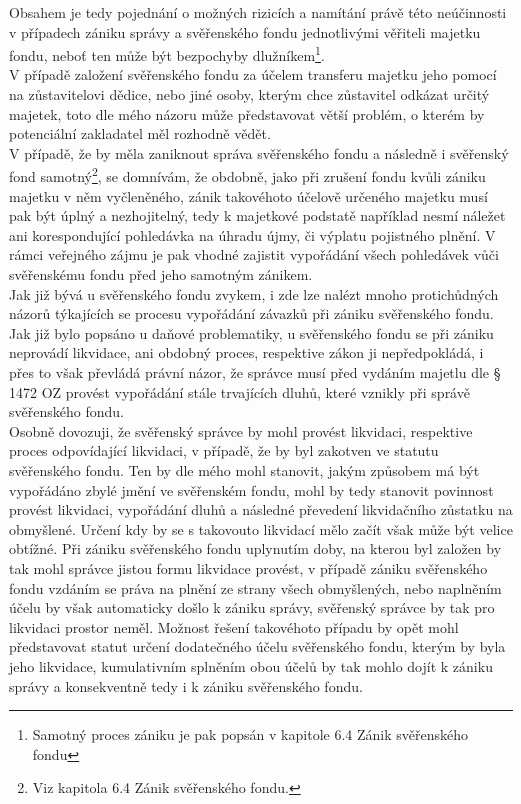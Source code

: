 \documentclass{article}
\begin{document}
Obsahem je tedy pojednání o možných rizicích a namítání právě této neúčinnosti v případech zániku správy a svěřenského fondu jednotlivými věřiteli majetku fondu, neboť ten může být bezpochyby dlužníkem\footnote{Samotný proces zániku je pak popsán v kapitole 6.4 Zánik svěřenského fondu}.\\


V případě založení svěřenského fondu za účelem transferu majetku jeho pomocí na zůstavitelovi dědice, nebo jiné osoby, kterým chce zůstavitel odkázat určitý majetek, toto dle mého názoru může představovat větší problém, o kterém by potenciální zakladatel měl rozhodně vědět.\\

V případě, že by měla zaniknout správa svěřenského fondu a následně i svěřenský fond samotný\footnote{Viz kapitola 6.4 Zánik svěřenského fondu.}, se domnívám, že obdobně, jako při zrušení fondu kvůli zániku majetku v něm vyčleněného, zánik takovéhoto účelově určeného majetku musí pak být úplný a nezhojitelný, tedy k majetkové podstatě například nesmí náležet ani korespondující pohledávka na úhradu újmy, či výplatu pojistného plnění. V rámci veřejného zájmu je pak vhodné zajistit vypořádání všech pohledávek vůči svěřenskému fondu před jeho samotným zánikem.\\

Jak již bývá u svěřenského fondu zvykem, i zde lze nalézt mnoho protichůdných názorů týkajících se procesu vypořádání závazků při zániku svěřenského fondu. Jak již bylo popsáno u daňové problematiky, u svěřenského fondu se při zániku neprovádí likvidace, ani obdobný proces, respektive zákon ji nepředpokládá, i přes to však převládá právní názor, že správce musí před vydáním majetlu dle § 1472 OZ provést vypořádání stále trvajících dluhů, které vznikly při správě svěřenského fondu.\\

Osobně dovozuji, že svěřenský správce by mohl provést likvidaci, respektive proces odpovídající likvidaci, v případě, že by byl zakotven ve statutu svěřenského fondu. Ten by dle mého mohl stanovit, jakým způsobem má být vypořádáno zbylé jmění ve svěřenském fondu, mohl by tedy stanovit povinnost provést likvidaci, vypořádání dluhů a následné převedení likvidačního zůstatku na obmyšlené. Určení kdy by se s takovouto likvidací mělo začít však může být velice obtížné. Při zániku svěřenského fondu uplynutím doby, na kterou byl založen by tak mohl správce jistou formu likvidace provést, v případě zániku svěřenského fondu vzdáním se práva na plnění ze strany všech obmyšlených, nebo naplněním účelu by však automaticky došlo k zániku správy, svěřenský správce by tak pro likvidaci prostor neměl. Možnost řešení takovéhoto případu by opět mohl představovat statut určení dodatečného účelu svěřenského fondu, kterým by byla jeho likvidace, kumulativním splněním obou účelů by tak mohlo dojít k zániku správy a konsekventně tedy i k zániku svěřenského fondu.\\
\end{document}
